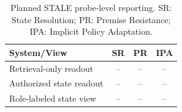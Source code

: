 \begin{table}[t]
\centering
\small
\begin{tabular}{lccc}
\toprule
System/View & SR & PR & IPA \\
\midrule
Retrieval-only readout & -- & -- & -- \\
Authorized state readout & -- & -- & -- \\
Role-labeled state view & -- & -- & -- \\
\bottomrule
\end{tabular}
\caption{Planned STALE probe-level reporting. SR: State Resolution; PR: Premise Resistance; IPA: Implicit Policy Adaptation.}
\label{tab:stale-placeholder}
\end{table}
